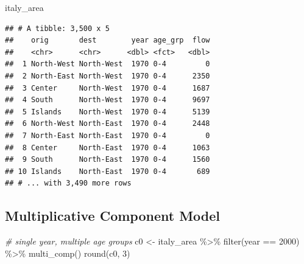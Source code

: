 \documentclass[
]{book}
\newenvironment{Shaded}{\begin{snugshade}}{\end{snugshade}}
\newcommand{\CommentTok}[1]{\textcolor[rgb]{0.56,0.35,0.01}{\textit{#1}}}
\newcommand{\DecValTok}[1]{\textcolor[rgb]{0.00,0.00,0.81}{#1}}
\newcommand{\FunctionTok}[1]{\textcolor[rgb]{0.00,0.00,0.00}{#1}}
\newcommand{\NormalTok}[1]{#1}
\newcommand{\OtherTok}[1]{\textcolor[rgb]{0.56,0.35,0.01}{#1}}
\newcommand{\SpecialCharTok}[1]{\textcolor[rgb]{0.00,0.00,0.00}{#1}}
\begin{document}
\begin{Shaded}
\begin{Highlighting}[]
\NormalTok{italy\_area}
\end{Highlighting}
\end{Shaded}

\begin{verbatim}
## # A tibble: 3,500 x 5
##    orig       dest        year age_grp  flow
##    <chr>      <chr>      <dbl> <fct>   <dbl>
##  1 North-West North-West  1970 0-4         0
##  2 North-East North-West  1970 0-4      2350
##  3 Center     North-West  1970 0-4      1687
##  4 South      North-West  1970 0-4      9697
##  5 Islands    North-West  1970 0-4      5139
##  6 North-West North-East  1970 0-4      2448
##  7 North-East North-East  1970 0-4         0
##  8 Center     North-East  1970 0-4      1063
##  9 South      North-East  1970 0-4      1560
## 10 Islands    North-East  1970 0-4       689
## # ... with 3,490 more rows
\end{verbatim}

\hypertarget{multiplicative-component-model-9}{%
\subsection{Multiplicative Component Model}\label{multiplicative-component-model-9}}

\begin{Shaded}
\begin{Highlighting}[]
\CommentTok{\# single year, multiple age groups}
\NormalTok{c0 }\OtherTok{\textless{}{-}}\NormalTok{ italy\_area }\SpecialCharTok{\%\textgreater{}\%}
  \FunctionTok{filter}\NormalTok{(year }\SpecialCharTok{==} \DecValTok{2000}\NormalTok{) }\SpecialCharTok{\%\textgreater{}\%}
  \FunctionTok{multi\_comp}\NormalTok{()}
\FunctionTok{round}\NormalTok{(c0, }\DecValTok{3}\NormalTok{)}
\end{Highlighting}
\end{Shaded}
\end{document}
